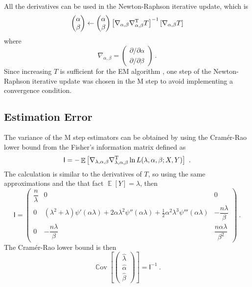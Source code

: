 \documentclass[12pt, a4paper]{memoir}
\DeclareMathOperator{\expectation}{\mathbb{E}}
\DeclareMathOperator{\cov}{\mathbb{C}ov}
\newcommand{\T}{^\textup{T}}
\newcommand{\matr}[1]{\mathsf{#1}}
\begin{document}
All the derivatives can be used in the Newton-Raphson iterative update, which is
\begin{equation}
\begin{pmatrix}
\alpha \\ \beta
\end{pmatrix}
\leftarrow
\begin{pmatrix}
\alpha \\ \beta
\end{pmatrix}
\left[
	\nabla_{\alpha,\beta}\nabla_{\alpha,\beta}\T T
\right]^{-1}
\left[\nabla_{\alpha,\beta} T\right]
\end{equation}
where
\begin{equation}
\nabla_{\alpha,\beta}=
\begin{pmatrix}
	{\partial}/{\partial \alpha}
	\\
	{\partial}/{\partial \beta}
\end{pmatrix} \ .
\end{equation}
Since increasing $T$ is sufficient for the EM algorithm \citep{dempster1977maximum}, one step of the Newton-Raphson iterative update was chosen in the M step to avoid implementing a convergence condition.

\subsection{Estimation Error}

The variance of the M step estimators can be obtained by using the Cram\'er-Rao lower bound \citep{rao1945information} \citep{cramer1946mathematical} from the Fisher's information matrix defined as
\begin{equation}
\matr{I} = -\expectation\left[
\nabla_{\lambda,\alpha,\beta}\nabla_{\lambda,\alpha,\beta}\T \ln L(\lambda,\alpha,\beta;X,Y)
\right] \ .
\end{equation}
The calculation is similar to the derivatives of $T$, so using the same approximations and the that fact $\expectation[Y]=\lambda$, then
\begin{equation}
\matr{I}
=
\begin{pmatrix}
\dfrac{n}{\lambda} & 0 & 0 \\
0 & (\lambda^2+\lambda)\psi'(\alpha\lambda)+2\alpha\lambda^2\psi''(\alpha\lambda)+\frac{1}{2}\alpha^2\lambda^3\psi'''(\alpha\lambda) & -\dfrac{n\lambda}{\beta}\\
0 & -\dfrac{n\lambda}{\beta} & \dfrac{n\alpha\lambda}{\beta^2}
\end{pmatrix} \ .
\end{equation}
The Cram\'er-Rao lower bound is then
\begin{equation}
\cov\left[
\begin{pmatrix}
\widehat{\lambda}\\\widehat{\alpha}\\\widehat{\beta}
\end{pmatrix}
\right]
= \matr{I}^{-1} \ .
\end{equation}
\end{document}
